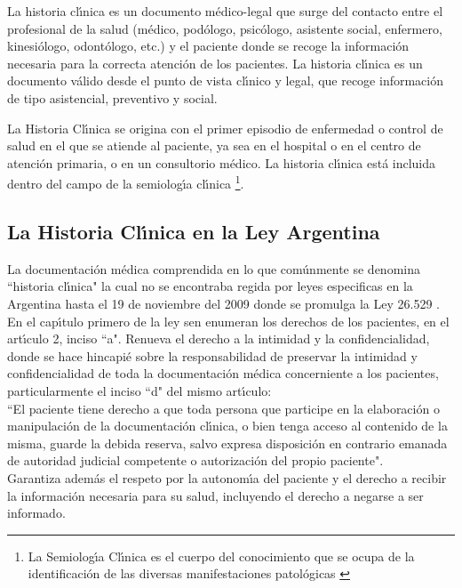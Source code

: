 La historia cl\'{\i}nica es un documento m\'edico-legal que surge del contacto entre el 
profesional de la salud (m\'edico, pod\'ologo, psic\'ologo, asistente social, enfermero, 
kinesi\'ologo, odont\'ologo, etc.) y el paciente donde se recoge la informaci\'on necesaria 
para la correcta atenci\'on de los pacientes. La historia cl\'{\i}nica es un documento 
v\'alido desde el punto de vista cl\'{\i}nico y legal, que recoge informaci\'on de tipo 
asistencial, preventivo y social.

La Historia Cl\'{\i}nica se origina con el primer episodio de enfermedad o control de salud en 
el que se atiende al paciente, ya sea en el hospital o en el centro de atenci\'on primaria, 
o en un consultorio m\'edico. La historia cl\'{\i}nica est\'a incluida dentro del campo de la 
semiolog\'{\i}a cl\'{\i}nica \footnote{La Semiolog\'{\i}a Cl\'{\i}nica es el cuerpo del conocimiento
que se ocupa de la identificaci\'on de las diversas manifestaciones patol\'ogicas 
\cite{SemiClin}}.

\subsection{La Historia Cl\'{\i}nica en la Ley Argentina}

La documentaci\'on m\'edica comprendida en lo que com\'unmente se denomina ``historia 
cl\'{\i}nica" la cual no se encontraba regida por leyes especificas en la Argentina hasta
el 19 de noviembre del 2009 donde se promulga la Ley 26.529 \cite{LeyHC}.\\[0.1cm]

En el cap\'{\i}tulo primero de la ley sen enumeran los derechos de los pacientes, 
en el art\'{\i}culo 2, inciso ``a". Renueva el derecho a la intimidad y la confidencialidad, 
donde se hace hincapi\'e sobre la responsabilidad de preservar la intimidad y 
confidencialidad de toda la documentaci\'on m\'edica concerniente a los pacientes, 
particularmente el inciso ``d" del mismo art\'{\i}culo:\\[0.1cm]

``El paciente tiene derecho a que toda persona que participe en la elaboraci\'on 
o manipulaci\'on de la documentaci\'on cl\'{\i}nica, o bien tenga acceso al contenido de 
la misma, guarde la debida reserva, salvo expresa disposici\'on en contrario 
emanada de autoridad judicial competente o autorizaci\'on del propio paciente".\\[0.1cm]

Garantiza adem\'as el respeto por la autonom\'{\i}a del paciente y el derecho a recibir 
la informaci\'on necesaria para su salud, incluyendo el derecho a negarse a ser 
informado.\\[0.1cm]

